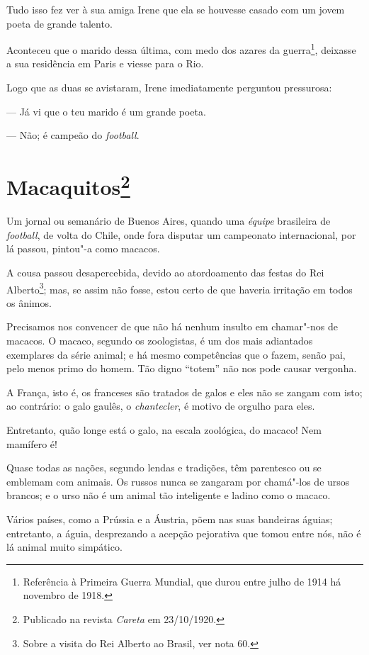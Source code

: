 Tudo isso fez ver à sua amiga Irene que ela se houvesse casado com um
jovem poeta de grande talento.

Aconteceu que o marido dessa última, com medo dos azares da
guerra\footnote{Referência à Primeira Guerra Mundial, que durou entre
  julho de 1914 há novembro de 1918.}, deixasse a sua residência em
Paris e viesse para o Rio.

Logo que as duas se avistaram, Irene imediatamente perguntou pressurosa:

--- Já vi que o teu marido é um grande poeta.

--- Não; é campeão do \emph{football}.



\chapter[Macaquitos]{Macaquitos\footnote[*]{Publicado na revista \emph{Careta} em 23/10/1920.}}

Um jornal ou semanário de Buenos Aires, quando uma \emph{équipe}
brasileira de \emph{football}, de volta do Chile, onde fora disputar um
campeonato internacional, por lá passou, pintou"-a como macacos.

A cousa passou desapercebida, devido ao atordoamento das festas do Rei
Alberto\footnote{Sobre a visita do Rei Alberto ao Brasil, ver nota 60.};
mas, se assim não fosse, estou certo de que haveria irritação em todos
os ânimos.

Precisamos nos convencer de que não há nenhum insulto em chamar"-nos de
macacos. O macaco, segundo os zoologistas, é um dos mais adiantados
exemplares da série animal; e há mesmo competências que o fazem, senão
pai, pelo menos primo do homem. Tão digno ``totem'' não nos pode causar
vergonha.

A França, isto é, os franceses são tratados de galos e eles não se
zangam com isto; ao contrário: o galo gaulês, o \emph{chantecler}, é
motivo de orgulho para eles.

Entretanto, quão longe está o galo, na escala zoológica, do macaco! Nem
mamífero é!

Quase todas as nações, segundo lendas e tradições, têm parentesco ou se
emblemam com animais. Os russos nunca se zangaram por chamá"-los de ursos
brancos; e o urso não é um animal tão inteligente e ladino como o
macaco.

Vários países, como a Prússia e a Áustria, põem nas suas bandeiras
águias; entretanto, a águia, desprezando a acepção pejorativa que tomou
entre nós, não é lá animal muito simpático.

